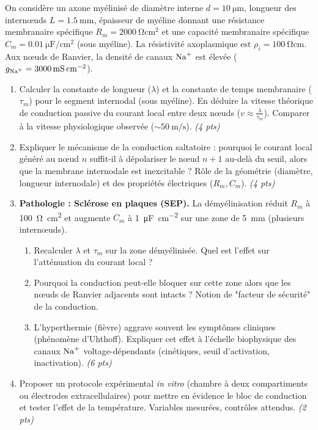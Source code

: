 \documentclass[11pt]{article}
\begin{document}
\begin{exercice}
On considère un axone myélinisé de diamètre interne $d = \SI{10}{\micro\metre}$, longueur des internœuds $L = \SI{1,5}{\milli\metre}$, épaisseur de myéline donnant une résistance membranaire spécifique $R_m = \SI{2000}{\ohm\centi\metre\squared}$ et une capacité membranaire spécifique $C_m = \SI{0,01}{\micro\farad\per\centi\metre\squared}$ (sous myéline). La résistivité axoplasmique est $\rho_i = \SI{100}{\ohm\centi\metre}$. Aux nœuds de Ranvier, la densité de canaux $\ce{Na+}$ est élevée ($g_{\ce{Na+}} = \SI{3000}{\milli\siemens\per\centi\metre\squared}$).

\begin{enumerate}
    \item Calculer la constante de longueur ($\lambda$) et la constante de temps membranaire ($\tau_m$) pour le segment internodal (sous myéline). En déduire la vitesse théorique de conduction passive du courant local entre deux nœuds ($v \approx \frac{\lambda}{\tau_m}$). Comparer à la vitesse physiologique observée ($\sim \SI{50}{\metre\per\second}$). \textit{(4 pts)}
    \item Expliquer le mécanisme de la conduction saltatoire : pourquoi le courant local généré au nœud $n$ suffit-il à dépolariser le nœud $n+1$ au-delà du seuil, alors que la membrane internodale est inexcitable ? Rôle de la géométrie (diamètre, longueur internodale) et des propriétés électriques ($R_m, C_m$). \textit{(4 pts)}
    \item \textbf{Pathologie : Sclérose en plaques (SEP).} La démyélinisation réduit $R_m$ à \SI{100}{\ohm\centi\metre\squared} et augmente $C_m$ à \SI{1}{\micro\farad\per\centi\metre\squared} sur une zone de \SI{5}{\milli\metre} (plusieurs internœuds).
    \begin{enumerate}
        \item Recalculer $\lambda$ et $\tau_m$ sur la zone démyélinisée. Quel est l'effet sur l'atténuation du courant local ?
        \item Pourquoi la conduction peut-elle bloquer sur cette zone alors que les nœuds de Ranvier adjacents sont intacts ? Notion de "facteur de sécurité" de la conduction.
        \item L'hyperthermie (fièvre) aggrave souvent les symptômes cliniques (phénomène d'Uhthoff). Expliquer cet effet à l'échelle biophysique des canaux $\ce{Na+}$ voltage-dépendants (cinétiques, seuil d'activation, inactivation). \textit{(6 pts)}
    \end{enumerate}
    \item Proposer un protocole expérimental \textit{in vitro} (chambre à deux compartiments ou électrodes extracellulaires) pour mettre en évidence le bloc de conduction et tester l'effet de la température. Variables mesurées, contrôles attendus. \textit{(2 pts)}
\end{enumerate}
\end{exercice}
\end{document}
